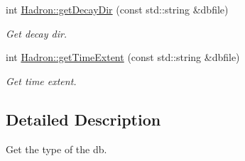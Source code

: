 \begin{DoxyCompactItemize}
int \mbox{\hyperlink{namespaceHadron_ae5c5e7cd57aa116ce56262bf00762610}{Hadron\+::get\+Decay\+Dir}} (const std\+::string \&dbfile)
\begin{DoxyCompactList}\small\item\em Get decay dir. \end{DoxyCompactList}\item 
int \mbox{\hyperlink{namespaceHadron_a660c9f3adc1525c9d326b23398d09494}{Hadron\+::get\+Time\+Extent}} (const std\+::string \&dbfile)
\begin{DoxyCompactList}\small\item\em Get time extent. \end{DoxyCompactList}\end{DoxyCompactItemize}


\subsection{Detailed Description}
Get the type of the db. 

